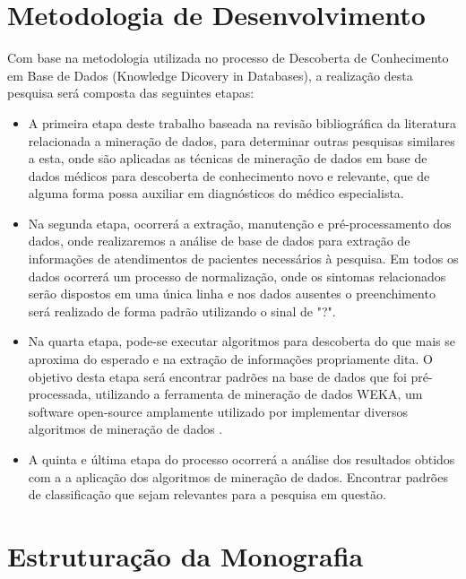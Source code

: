 \documentclass[
	12pt,				%
	openright,			%
	oneside,	
	a4paper,				%
	english,				%
	brazil				%
]{abntex2/abntex2} %
\begin{document}
	\section{Metodologia de Desenvolvimento}
		
		Com base na metodologia utilizada no processo de Descoberta de Conhecimento em Base de Dados (Knowledge Dicovery in Databases), a realização desta pesquisa será composta das seguintes etapas:
		
		\begin{itemize}
			\item A primeira etapa deste trabalho baseada na revisão bibliográfica da literatura relacionada a mineração de dados, para determinar outras pesquisas similares a esta, onde são aplicadas as técnicas de mineração de dados em base de dados médicos para descoberta de conhecimento novo e relevante, que de alguma forma possa auxiliar em diagnósticos do médico especialista.
			
			\item Na segunda etapa, ocorrerá a extração, manutenção e pré-processamento dos dados, onde realizaremos a análise de base de dados para extração de informações de atendimentos de pacientes necessários à pesquisa. Em todos os dados ocorrerá um processo de normalização, onde os sintomas relacionados serão dispostos em uma única linha e nos dados ausentes o preenchimento será realizado de forma padrão utilizando o sinal de "?".
			
			\item Na quarta etapa, pode-se executar algoritmos para descoberta do que mais se aproxima do esperado e na extração de informações propriamente dita. O objetivo desta etapa será encontrar padrões na base de dados que foi pré-processada, utilizando a ferramenta de mineração de dados WEKA, um software open-source amplamente utilizado por implementar diversos algoritmos de mineração de dados \cite{hall:2009}.
			
			\item A quinta e última etapa do processo ocorrerá a análise dos resultados obtidos com a a aplicação dos algoritmos de mineração de dados. Encontrar padrões de classificação que sejam relevantes para a pesquisa em questão.
			
		\end{itemize}
		
	\section{Estruturação da Monografia}
	
\end{document}
